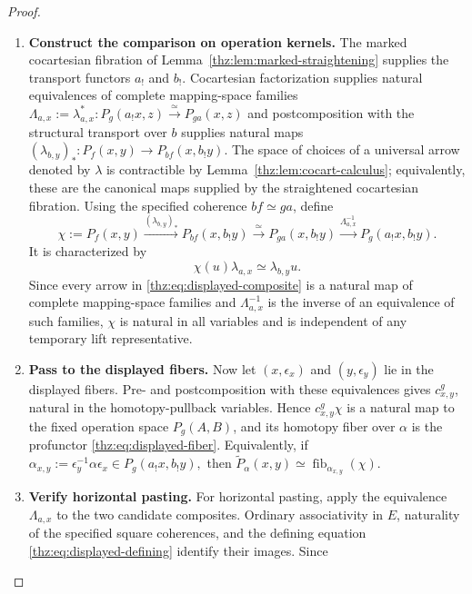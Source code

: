 \documentclass[oneside]{article}
\theoremstyle{plain}
\theoremstyle{definition}
\theoremstyle{remark}
\newcommand{\fib}{\operatorname{fib}}
\begin{document}
\begin{proof}
\leavevmode
\begin{enumerate}
\item \textbf{Construct the comparison on operation kernels.} The marked cocartesian fibration of
Lemma~\ref{thz:lem:marked-straightening} supplies the transport functors
$a_!$ and $b_!$.  Cocartesian factorization supplies natural equivalences of
complete mapping-space families $\Lambda_{a,x}:= \lambda_{a,x}^*: P_g(a_!x,z)\xrightarrow{\simeq}P_{ga}(x,z)$ and postcomposition with the structural transport over $b$ supplies natural
maps $(\lambda_{b,y})_*: P_f(x,y)\longrightarrow P_{bf}(x,b_!y).$ The space of choices of a universal arrow denoted by $\lambda$ is
contractible by Lemma~\ref{thz:lem:cocart-calculus}; equivalently, these are
the canonical maps supplied by the straightened cocartesian fibration.  Using
the specified coherence $bf\simeq ga$, define
\begin{equation}\label{thz:eq:displayed-composite}
 \chi:=
 P_f(x,y)
 \xrightarrow{(\lambda_{b,y})_*}
 P_{bf}(x,b_!y)
 \xrightarrow{\simeq}
 P_{ga}(x,b_!y)
 \xrightarrow{\Lambda_{a,x}^{-1}}
 P_g(a_!x,b_!y).
\end{equation}
It is characterized by
\begin{equation}\label{thz:eq:displayed-defining}
 \chi(u)\lambda_{a,x}\simeq\lambda_{b,y}u.
\end{equation}
Since every arrow in \eqref{thz:eq:displayed-composite} is a natural map of
complete mapping-space families and $\Lambda_{a,x}^{-1}$ is the inverse of an
equivalence of such families, $\chi$ is natural in all variables and is
independent of any temporary lift representative.
\item \textbf{Pass to the displayed fibers.} Now let $(x,\epsilon_x)$ and $(y,\epsilon_y)$ lie in the displayed fibers.
Pre- and postcomposition with these equivalences gives
$c^g_{x,y}$, natural in the homotopy-pullback variables.  Hence
$c^g_{x,y}\chi$ is a natural map to the fixed operation space $P_g(A,B)$,
and its homotopy fiber over $\alpha$ is the profunctor
\eqref{thz:eq:displayed-fiber}.  Equivalently, if $\alpha_{x,y}:=\epsilon_y^{-1}\alpha\epsilon_x \in P_g(a_!x,b_!y),$ then $\widetilde P_\alpha(x,y)\simeq\fib_{\alpha_{x,y}}(\chi)$.
\item \textbf{Verify horizontal pasting.} For horizontal pasting, apply the equivalence $\Lambda_{a,x}$ to the two
candidate composites.  Ordinary associativity in $E$, naturality of the
specified square coherences, and the defining equation
\eqref{thz:eq:displayed-defining} identify their images.  Since

\end{enumerate}
\end{proof}
\end{document}
